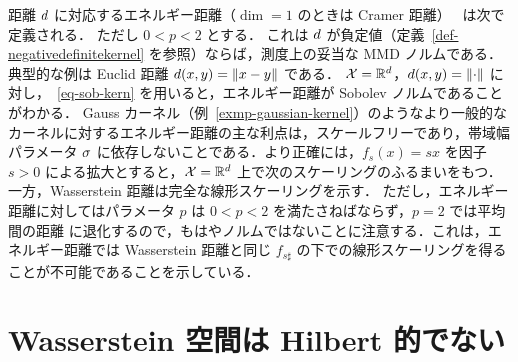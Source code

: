 \begin{example}[エネルギー距離]\label{exp-energy-dist}
距離 $d$ に対応するエネルギー距離（$\dim=1$ のときは Cramer 距離）~\citep{szekely2004testing} は次で定義される．
ただし $0 < p < 2$ とする．
%
これは $d$ が負定値（定義~\ref{def-negativedefinitekernel} を参照）ならば，測度上の妥当な MMD ノルムである．典型的な例は Euclid 距離 $d(x,y)=\left\| x-y \right\|$ である．
%
$\mathcal{X}=\mathbb{R}^d$，$d(x,y)=\left\| \cdot \right\|$ に対し，~\eqref{eq-sob-kern} を用いると，エネルギー距離が Sobolev ノルムであることがわかる．
Gauss カーネル（例~\ref{exmp-gaussian-kernel}）のようなより一般的なカーネルに対するエネルギー距離の主な利点は，スケールフリーであり，帯域幅パラメータ $\sigma$ に依存しないことである．より正確には，$f_s(x)=sx$ を因子 $s>0$ による拡大とすると，$\mathcal{X}=\mathbb{R}^d$ 上で次のスケーリングのふるまいをもつ．
一方，Wasserstein 距離は完全な線形スケーリングを示す．
ただし，エネルギー距離に対してはパラメータ $p$ は $0 < p < 2$ を満たさねばならず，$p=2$ では平均間の距離
に退化するので，もはやノルムではないことに注意する．これは，エネルギー距離では Wasserstein 距離と同じ $f_{s\sharp}$ の下での線形スケーリングを得ることが不可能であることを示している．
%
\end{example}





\section{Wasserstein 空間は Hilbert 的でない}\label{sec-non-embeddability}

